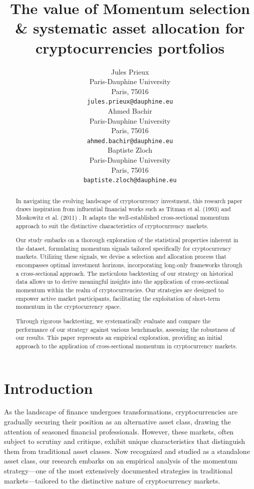 \documentclass{article}
\title{The value of Momentum selection \&  systematic asset allocation for cryptocurrencies portfolios}
\author{
 Jules Prieux \\
  Paris-Dauphine University\\
  Paris, 75016  \\
  \texttt{jules.prieux@dauphine.eu} \\
   \And
 Ahmed Bachir \\
  Paris-Dauphine University\\
  Paris, 75016 \\
  \texttt{ahmed.bachir@dauphine.eu} \\
  \And
 Baptiste Zloch \\
  Paris-Dauphine University\\
  Paris, 75016 \\
  \texttt{baptiste.zloch@dauphine.eu} \\
}
\begin{document}
\maketitle
\begin{abstract}

In navigating the evolving landscape of cryptocurrency investment, this research paper draws inspiration from influential financial works such as Titman et al. (1993)\cite{Titman1993} and  Moskowitz et al. 
 (2011) \cite{Moskowitz2011}. It adapts the well-established cross-sectional momentum approach to suit the distinctive characteristics of cryptocurrency markets.

Our study embarks on a thorough exploration of the statistical properties inherent in the dataset, formulating momentum signals tailored specifically for cryptocurrency markets. Utilizing these signals, we devise a selection and allocation process that encompasses optimal investment horizons, incorporating long-only frameworks through a cross-sectional approach. The meticulous backtesting of our strategy on historical data allows us to derive meaningful insights into the application of cross-sectional momentum within the realm of cryptocurrencies. Our strategies are designed to empower active market participants, facilitating the exploitation of short-term momentum in the cryptocurrency space.

Through rigorous backtesting, we systematically evaluate and compare the performance of our strategy against various benchmarks, assessing the robustness of our results. This paper represents an empirical exploration, providing an initial approach to the application of cross-sectional momentum in cryptocurrency markets.
\end{abstract}
\vspace*{\fill}
\newpage
\section{Introduction}\label{sec:introduction}

As the landscape of finance undergoes transformations, cryptocurrencies are gradually securing their position as an alternative asset class, drawing the attention of seasoned financial professionals. However, these markets, often subject to scrutiny and critique, exhibit unique characteristics that distinguish them from traditional asset classes. Now recognized and studied as a standalone asset class, our research embarks on an empirical analysis of the momentum strategy—one of the most extensively documented strategies in traditional markets—tailored to the distinctive nature of cryptocurrency markets.
\end{document}
